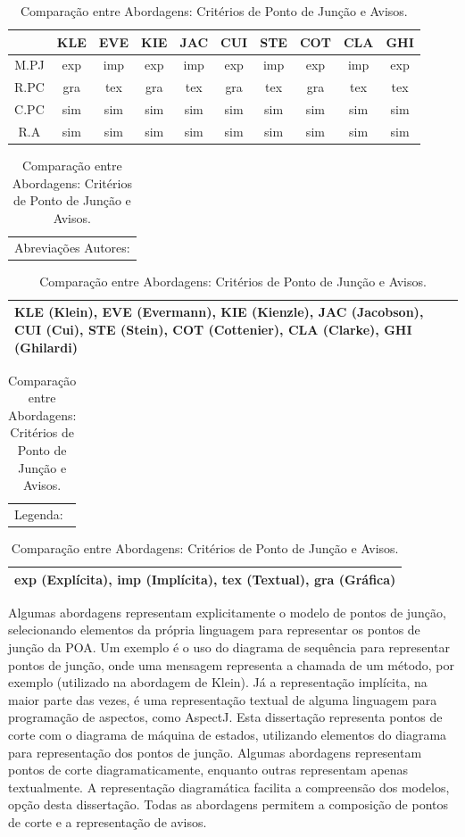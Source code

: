 \begin{table}[h]
	\centering
	\begin{tabular}{ | c | c | c | c | c | c | c | c | c | c | }
		\hline
		 & KLE & EVE & KIE & JAC & CUI & STE & COT & CLA & GHI \\
		\hline
		 M.PJ & exp & imp & exp & imp & exp & imp & exp & imp & exp  \\
		\hline
		 R.PC & gra & tex & gra & tex & gra & tex & gra & tex & tex \\
		\hline
		 C.PC & sim & sim & sim & sim & sim & sim & sim & sim & sim \\
		\hline
		 R.A & sim & sim & sim & sim & sim & sim & sim & sim & sim \\
		\hline
	\end{tabular}
	
	\hspace{2em}
	
	\begin{tabular}{  p{11cm}  }
		Abreviações Autores: \\
	\end{tabular}
	
	\begin{tabular}{ | p{11cm} | }
		\hline
		KLE (Klein), EVE (Evermann), KIE (Kienzle), JAC (Jacobson), CUI (Cui), STE (Stein), COT (Cottenier), CLA (Clarke), GHI (Ghilardi) \\
		\hline
	\end{tabular}
	
	\begin{tabular}{  p{11cm}  }
		Legenda: \\
	\end{tabular}

	\begin{tabular}{ | p{11cm} | }
		\hline
		exp (Explícita), imp (Implícita), tex (Textual), gra (Gráfica)  \\
		\hline
	\end{tabular}
	\caption{Comparação entre Abordagens: Critérios de Ponto de Junção e Avisos.}
	\label{tab:comparison_table_join_points_advices}
\end{table} 

Algumas abordagens representam explicitamente o modelo de pontos de junção, selecionando elementos da própria linguagem para representar os pontos de
junção da POA. Um exemplo é o uso do diagrama de sequência para representar pontos de junção, onde uma mensagem representa a chamada de um método, por
exemplo (utilizado na abordagem de Klein). Já a representação implícita, na maior parte das vezes, é uma representação textual de alguma linguagem
para programação de aspectos, como AspectJ. Esta dissertação representa pontos de corte com o diagrama de máquina de estados, utilizando elementos do diagrama 
para representação dos pontos de junção. Algumas abordagens representam pontos de corte diagramaticamente, enquanto outras representam apenas
textualmente. A representação diagramática facilita a compreensão dos modelos, opção desta dissertação. Todas as abordagens permitem a composição de
pontos de corte e a representação de avisos.

